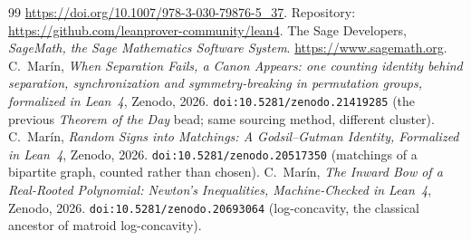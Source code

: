 \documentclass[11pt]{article}
\begin{document}
\begin{thebibliography}{99}
\url{https://doi.org/10.1007/978-3-030-79876-5_37}. Repository:
\url{https://github.com/leanprover-community/lean4}.
 The Sage Developers, \emph{SageMath, the Sage Mathematics Software System}.
\url{https://www.sagemath.org}.
 C.~Mar\'in, \emph{When Separation Fails, a Canon Appears: one counting identity
behind separation, synchronization and symmetry-breaking in permutation groups, formalized in
Lean~4}, Zenodo, 2026. \texttt{doi:10.5281/zenodo.21419285} (the previous
\emph{Theorem of the Day} bead; same sourcing method, different cluster).
 C.~Mar\'in, \emph{Random Signs into Matchings: A Godsil--Gutman Identity,
Formalized in Lean~4}, Zenodo, 2026. \texttt{doi:10.5281/zenodo.20517350} (matchings of a
bipartite graph, counted rather than chosen).
 C.~Mar\'in, \emph{The Inward Bow of a Real-Rooted Polynomial: Newton's
Inequalities, Machine-Checked in Lean~4}, Zenodo, 2026. \texttt{doi:10.5281/zenodo.20693064}
(log-concavity, the classical ancestor of matroid log-concavity).
\end{thebibliography}
\end{document}
